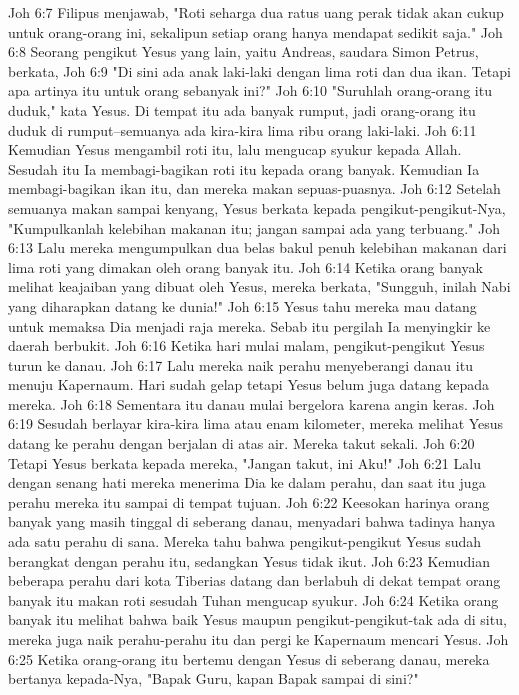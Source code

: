 Joh 6:7  Filipus menjawab, "Roti seharga dua ratus uang perak tidak akan cukup untuk orang-orang ini, sekalipun setiap orang hanya mendapat sedikit saja."
Joh 6:8  Seorang pengikut Yesus yang lain, yaitu Andreas, saudara Simon Petrus, berkata,
Joh 6:9  "Di sini ada anak laki-laki dengan lima roti dan dua ikan. Tetapi apa artinya itu untuk orang sebanyak ini?"
Joh 6:10  "Suruhlah orang-orang itu duduk," kata Yesus. Di tempat itu ada banyak rumput, jadi orang-orang itu duduk di rumput--semuanya ada kira-kira lima ribu orang laki-laki.
Joh 6:11  Kemudian Yesus mengambil roti itu, lalu mengucap syukur kepada Allah. Sesudah itu Ia membagi-bagikan roti itu kepada orang banyak. Kemudian Ia membagi-bagikan ikan itu, dan mereka makan sepuas-puasnya.
Joh 6:12  Setelah semuanya makan sampai kenyang, Yesus berkata kepada pengikut-pengikut-Nya, "Kumpulkanlah kelebihan makanan itu; jangan sampai ada yang terbuang."
Joh 6:13  Lalu mereka mengumpulkan dua belas bakul penuh kelebihan makanan dari lima roti yang dimakan oleh orang banyak itu.
Joh 6:14  Ketika orang banyak melihat keajaiban yang dibuat oleh Yesus, mereka berkata, "Sungguh, inilah Nabi yang diharapkan datang ke dunia!"
Joh 6:15  Yesus tahu mereka mau datang untuk memaksa Dia menjadi raja mereka. Sebab itu pergilah Ia menyingkir ke daerah berbukit.
Joh 6:16  Ketika hari mulai malam, pengikut-pengikut Yesus turun ke danau.
Joh 6:17  Lalu mereka naik perahu menyeberangi danau itu menuju Kapernaum. Hari sudah gelap tetapi Yesus belum juga datang kepada mereka.
Joh 6:18  Sementara itu danau mulai bergelora karena angin keras.
Joh 6:19  Sesudah berlayar kira-kira lima atau enam kilometer, mereka melihat Yesus datang ke perahu dengan berjalan di atas air. Mereka takut sekali.
Joh 6:20  Tetapi Yesus berkata kepada mereka, "Jangan takut, ini Aku!"
Joh 6:21  Lalu dengan senang hati mereka menerima Dia ke dalam perahu, dan saat itu juga perahu mereka itu sampai di tempat tujuan.
Joh 6:22  Keesokan harinya orang banyak yang masih tinggal di seberang danau, menyadari bahwa tadinya hanya ada satu perahu di sana. Mereka tahu bahwa pengikut-pengikut Yesus sudah berangkat dengan perahu itu, sedangkan Yesus tidak ikut.
Joh 6:23  Kemudian beberapa perahu dari kota Tiberias datang dan berlabuh di dekat tempat orang banyak itu makan roti sesudah Tuhan mengucap syukur.
Joh 6:24  Ketika orang banyak itu melihat bahwa baik Yesus maupun pengikut-pengikut-tak ada di situ, mereka juga naik perahu-perahu itu dan pergi ke Kapernaum mencari Yesus.
Joh 6:25  Ketika orang-orang itu bertemu dengan Yesus di seberang danau, mereka bertanya kepada-Nya, "Bapak Guru, kapan Bapak sampai di sini?"
